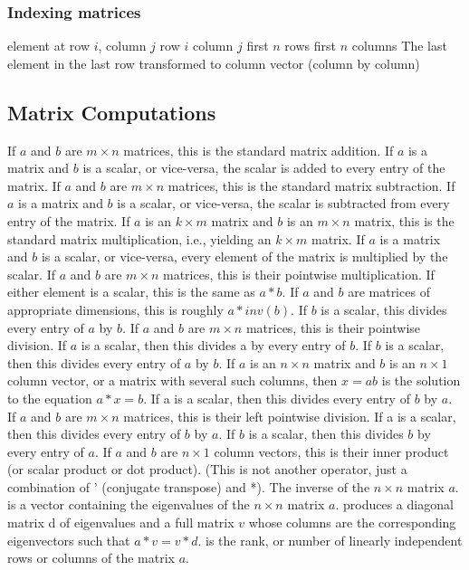 \subsubsection{Indexing matrices}{}
	{element at row $i$, column $j$}
	{row $i$}
	{column $j$}
	{first $n$ rows}
	{first $n$ columns}
	{The last element in the last row}
	{transformed to column vector (column by column)}

\subsection{Matrix Computations}{}
	{If $a$ and $b$ are $m \times n$ matrices, this is the standard matrix addition. If $a$ is a matrix and $b$ is a scalar, or vice-versa, the scalar is added to every entry of the matrix.}
	{If $a$ and $b$ are $m \times n$ matrices, this is the standard matrix subtraction. If $a$ is a matrix and $b$ is a scalar, or vice-versa, the scalar is subtracted from every entry of the matrix.}
	{If $a$ is an $k \times m$ matrix and $b$ is an $m \times n$ matrix, this is the standard matrix multiplication, i.e., yielding an $k \times m$ matrix. If $a$ is a matrix and $b$ is a scalar, or vice-versa, every element of the matrix is multiplied by the scalar.}
	{If $a$ and $b$ are $m \times n$ matrices, this is their pointwise multiplication. If either element is a scalar, this is the same as $a*b$.}
	{If $a$ and $b$ are matrices of appropriate dimensions, this is roughly $a*inv(b).$ If $b$ is a scalar, this divides every entry of $a$ by $b$.}
	{If $a$ and $b$ are $m \times n$ matrices, this is their
pointwise division. If $a$ is a scalar, then this divides a by every entry of
$b$. If $b$ is a scalar, then this divides every entry of $a$ by $b$. }
	{If $a$ is an $n \times n$ matrix and $b$ is an $n \times
1$ column vector, or a matrix with several such columns, then $x=a$\bs$b$ is the
solution to the equation $a*x=b$. If a is a scalar, then this divides every
entry of $b$ by $a$.}
	{If $a$ and $b$ are $m \times n$ matrices, this is their
left pointwise division. If a is a scalar, then this divides every entry of $b$
by $a$. If $b$ is a scalar, then this divides $b$ by every entry of $a$.}
	{If $a$ and $b$ are $n \times 1$ column vectors, this is their inner product (or scalar product or dot product). (This is not another operator, just a combination of ' (conjugate transpose) and *).}
	{The inverse of the $n \times n$ matrix $a$.}
	{is a vector containing the eigenvalues of the $n \times n$ matrix $a$.}
	{produces a diagonal matrix d of eigenvalues and a full
    matrix $v$ whose columns are the corresponding eigenvectors such that $a*v=v*d$.}
	{is the rank, or number of linearly independent rows or columns of the matrix $a$.}


